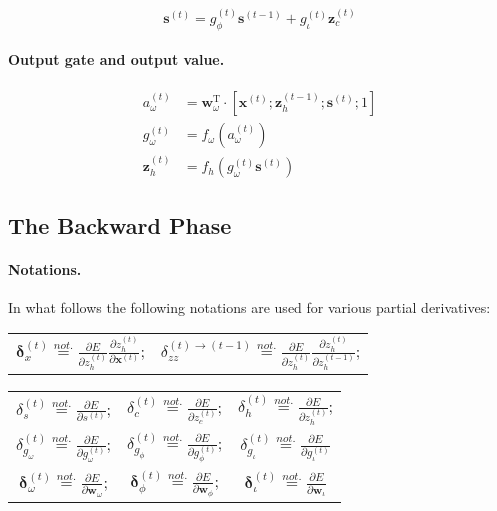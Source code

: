 \documentclass[11pt]{article}
\begin{document}
\begin{equation}
    \mathbf{s}^{(t)} = g_{\phi}^{(t)} \mathbf{s}^{(t-1)} + g_{\iota}^{(t)} \mathbf{z}_{c}^{(t)}
\end{equation}

\paragraph{Output gate and output value.}

\begin{align}
a_{\omega}^{(t)} &= \mathbf{w}_{\omega}^{\text{T}} \cdot \left[\mathbf{x}^{(t)}; \mathbf{z}_{h}^{(t-1)}; \mathbf{s}^{(t)}; 1\right] \\
g_{\omega}^{(t)} &= f_{\omega}\left(a_{\omega}^{(t)}\right) \\
\mathbf{z}_h^{(t)} &= f_h\left(g_{\omega}^{(t)} \mathbf{s}^{(t)}\right)
\end{align}

\subsection{The Backward Phase}

\paragraph{Notations.} In what follows the following notations are used for various partial derivatives:

\begin{center}
\begin{tabular}{c c}
    $\boldsymbol{\delta}_{x}^{(t)} \overset{not.}{=} \displaystyle\frac{\partial E}{\partial z_h^{(t)}}\displaystyle\frac{\partial z_h^{(t)}} {\partial \mathbf{x}^{(t)}}$; &
    $\delta_{zz}^{(t)\rightarrow(t-1)} \overset{not.}{=} \displaystyle\frac{\partial E}{\partial z_h^{(t)}}\displaystyle\frac{\partial z_h^{(t)}} {\partial z_h^{(t-1)}}$; \\[20pt]
\end{tabular}
\begin{tabular}{c c c}
    $\delta_{s}^{(t)} \overset{not.}{=} \displaystyle\frac{\partial E}{\partial s^{(t)}}$; &
    $\delta_{c}^{(t)} \overset{not.}{=} \displaystyle\frac{\partial E}{\partial z_c^{(t)}}$; &
    $\delta_{h}^{(t)} \overset{not.}{=} \displaystyle\frac{\partial E}{\partial z_h^{(t)}}$;  \\[20pt]
    $\delta_{g_{\omega}}^{(t)} \overset{not.}{=} \displaystyle\frac{\partial E}{\partial g_{\omega}^{(t)}}$; &
    $\delta_{g_{\phi}}^{(t)} \overset{not.}{=} \displaystyle\frac{\partial E}{\partial g_{\phi}^{(t)}}$; &
    $\delta_{g_{\iota}}^{(t)} \overset{not.}{=} \displaystyle\frac{\partial E}{\partial g_{\iota}^{(t)}}$ \\[20pt]
    $\boldsymbol{\delta}_{\omega}^{(t)} \overset{not.}{=} \displaystyle\frac{\partial E}{\partial \mathbf{w}_{\omega}}$; &
    $\boldsymbol{\delta}_{\phi}^{(t)} \overset{not.}{=} \displaystyle\frac{\partial E}{\partial \mathbf{w}_{\phi}}$; &
    $\boldsymbol{\delta}_{\iota}^{(t)} \overset{not.}{=} \displaystyle\frac{\partial E}{\partial \mathbf{w}_{\iota}}$
\end{tabular}
\end{center}
\end{document}
